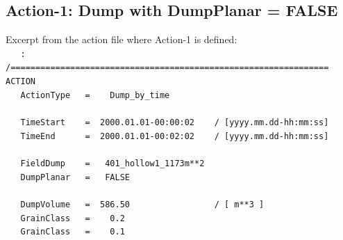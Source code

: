 \subsection{Action-1: Dump with DumpPlanar = FALSE}
Excerpt from the action file where Action-1 is defined:\\
\hspace*{3mm} \texttt{\small{~~~:}}\\
\hspace*{3mm} \texttt{\small{/================================================================}}\\
\hspace*{3mm} \texttt{\small{ACTION}}                                                           \\
\hspace*{3mm} \texttt{\small{~~~ActionType~~~=~~~~Dump\_by\_time}}                              \\
\hspace*{3mm} \texttt{\small{~~~}}                                                              \\
\hspace*{3mm} \texttt{\small{~~~TimeStart~~~~=~~2000.01.01-00:00:02~~~~/~[yyyy.mm.dd-hh:mm:ss]}}\\
\hspace*{3mm} \texttt{\small{~~~TimeEnd~~~~~~=~~2000.01.01-00:02:02~~~~/~[yyyy.mm.dd-hh:mm:ss]}}\\
\hspace*{3mm} \texttt{\small{~~~}}                                                              \\
\hspace*{3mm} \texttt{\small{~~~FieldDump~~~~=~~~401\_hollow1\_1173m**2}}                       \\
\hspace*{3mm} \texttt{\small{~~~DumpPlanar~~~=~~~FALSE~}}                                       \\
\hspace*{3mm} \texttt{\small{~~~}}                                                              \\
\hspace*{3mm} \texttt{\small{~~~DumpVolume~~~=~~586.50~~~~~~~~~~~~~~~~~/~[~m**3~]}}             \\
\hspace*{3mm} \texttt{\small{~~~GrainClass~~~=~~~~0.2}}                                         \\
\hspace*{3mm} \texttt{\small{~~~GrainClass~~~=~~~~0.1}}                                         \\
